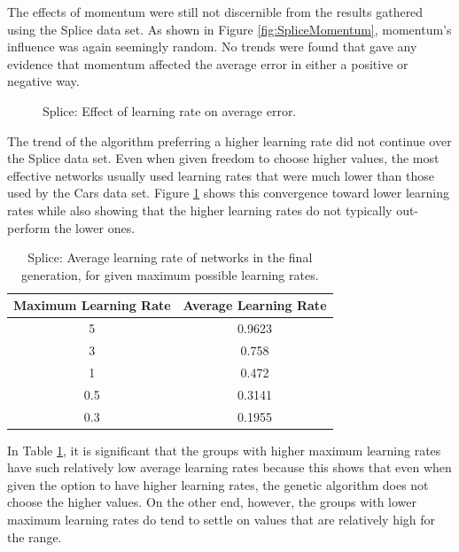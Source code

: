 \documentclass[10pt, conference, compsocconf]{IEEEtran}
\begin{document}
The effects of momentum were still not discernible from the results gathered using the Splice data set. As shown in Figure \ref{fig:SpliceMomentum}, momentum's influence was again seemingly random. No trends were found that gave any evidence that momentum affected the average error in either a positive or negative way.

\begin{figure}
\begin{center}
\end{center}
\caption{Splice: Effect of learning rate on average error.}
\label{fig:SpliceLearningRate}
\end{figure}

The trend of the algorithm preferring a higher learning rate did not continue over the Splice data set. Even when given freedom to choose higher values, the most effective networks usually used learning rates that were much lower than those used by the Cars data set. Figure \ref{fig:SpliceLearningRate} shows this convergence toward lower learning rates while also showing that the higher learning rates do not typically out-perform the lower ones.

\begin{table}
\caption{Splice: Average learning rate of networks in the final generation, for given maximum possible learning rates.}
\label{tbl:SpliceAverageLearningRates}
\centering
\begin{tabular}{c c}
\hline
Maximum Learning Rate & Average Learning Rate \\
\hline
5 & 0.9623 \\
3 & 0.758 \\
1 & 0.472 \\
0.5 & 0.3141 \\
0.3 & 0.1955 \\
\hline
\end{tabular}
\end{table}

In Table \ref{tbl:SpliceAverageLearningRates}, it is significant that the groups with higher maximum learning rates have such relatively low average learning rates because this shows that even when given the option to have higher learning rates, the genetic algorithm does not choose the higher values. On the other end, however, the groups with lower maximum learning rates do tend to settle on values that are relatively high for the range.
\end{document}
